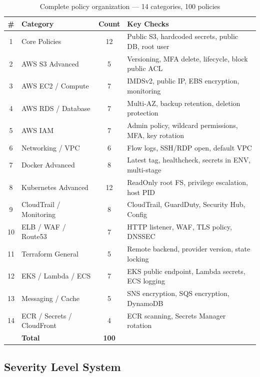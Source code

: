 \begin{table}[H]
\centering
\caption{Complete policy organization — 14 categories, 100 policies}
\label{tab:policy-categories-full}
\small
\begin{tabular}{|c|l|c|p{5.5cm}|}
\hline
\textbf{\#} & \textbf{Category} & \textbf{Count} & \textbf{Key Checks} \\
\hline
1 & Core Policies & 12 & Public S3, hardcoded secrets, public DB, root user \\
\hline
2 & AWS S3 Advanced & 5 & Versioning, MFA delete, lifecycle, block public ACL \\
\hline
3 & AWS EC2 / Compute & 7 & IMDSv2, public IP, EBS encryption, monitoring \\
\hline
4 & AWS RDS / Database & 7 & Multi-AZ, backup retention, deletion protection \\
\hline
5 & AWS IAM & 7 & Admin policy, wildcard permissions, MFA, key rotation \\
\hline
6 & Networking / VPC & 6 & Flow logs, SSH/RDP open, default VPC \\
\hline
7 & Docker Advanced & 8 & Latest tag, healthcheck, secrets in ENV, multi-stage \\
\hline
8 & Kubernetes Advanced & 12 & ReadOnly root FS, privilege escalation, host PID \\
\hline
9 & CloudTrail / Monitoring & 8 & CloudTrail, GuardDuty, Security Hub, Config \\
\hline
10 & ELB / WAF / Route53 & 7 & HTTP listener, WAF, TLS policy, DNSSEC \\
\hline
11 & Terraform General & 5 & Remote backend, provider version, state locking \\
\hline
12 & EKS / Lambda / ECS & 7 & EKS public endpoint, Lambda secrets, ECS logging \\
\hline
13 & Messaging / Cache & 5 & SNS encryption, SQS encryption, DynamoDB \\
\hline
14 & ECR / Secrets / CloudFront & 4 & ECR scanning, Secrets Manager rotation \\
\hline
\hline
& \textbf{Total} & \textbf{100} & \\
\hline
\end{tabular}
\end{table}

\subsection{Severity Level System}

